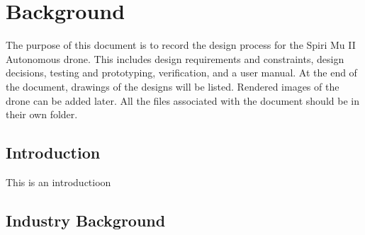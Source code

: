 \chapter{Background}
The purpose of this document is to record the design process for the Spiri Mu II Autonomous drone. This includes design requirements and constraints, design decisions, testing and prototyping, verification, and a user manual.
At the end of the document, drawings of the designs will be listed. Rendered images of the drone can be added later.
All the files associated with the document should be in their own folder.
\section{Introduction}
This is an introductioon
\section{Industry Background}

